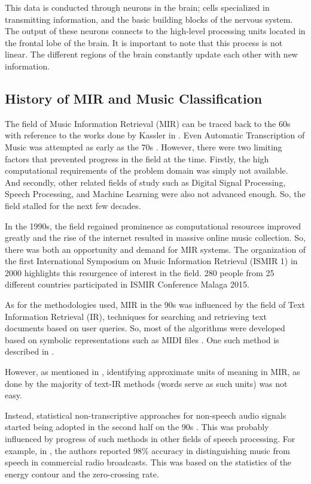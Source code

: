 This data is conducted through neurons in the brain; cells specialized in transmitting information, and the basic building blocks of the nervous system.
The output of these neurons connects to the high-level processing units located in the frontal lobe of the brain. It is important to note that this process
is not linear. The different regions of the brain constantly update each other with new information. 

\subsection{History of MIR and Music Classification}

The field of Music Information Retrieval (MIR) can be traced back to the 60s with reference to the works done by Kassler in \cite{kassler1966}.
Even Automatic Transcription of Music was attempted as early as the 70s \cite{andel1975}. However, there were two limiting factors that prevented progress in the field at the time.
Firstly, the high computational requirements of the problem domain was simply not available. 
And secondly, other related fields of study such as Digital Signal Processing, Speech Processing, and Machine Learning were also not advanced enough.  
So, the field stalled for the next few decades.

In the 1990s, the field regained prominence as computational resources improved greatly and the rise of the internet resulted in massive online music collection. So, there was both an opportunity and demand for MIR systems.
The organization of the first International Symposium on Music Information Retrieval (ISMIR 1) in 2000 highlights this resurgence of interest in the field. 
280 people from 25 different countries participated in ISMIR Conference Malaga 2015.

As for the methodologies used, MIR in the 90s was influenced by the field of Text Information Retrieval (IR), techniques for searching and retrieving text documents based on user queries.
So, most of the algorithms were developed based on symbolic representations such as MIDI files \cite{Tzanetakis2002a}. One such method is described in \cite{alghoniemy1999}.

However, as mentioned in \cite{byrd2002}, identifying approximate units of meaning in MIR, as done by the majority of text-IR methods (words serve as such units) was not easy.

Instead, statistical non-transcriptive approaches for non-speech audio signals started being adopted in the second half on the 90s \cite{Tzanetakis2002a}.
This was probably influenced by progress of such methods in other fields of speech processing. 
For example, in \cite{saunders1996}, the authors reported 98\% accuracy in distinguishing music from speech in commercial radio broadcasts.
This was based on the statistics of the energy contour and the zero-crossing rate.

